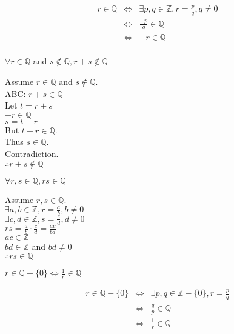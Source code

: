 \documentclass[letterpaper,12pt,fleqn]{article}
\begin{document}
\begin{theproof}
\begin{eqnarray*}
r\in\mathbb{Q} &\iff& \exists p,q\in\mathbb{Z},r=\frac{p}{q}, q\ne0 \\
    &\iff& \frac{-p}{q}\in\mathbb{Q} \\
    &\iff& -r\in\mathbb{Q} \\
\end{eqnarray*}
\end{theproof}

\begin{theorem}
$\forall r\in\mathbb{Q}$ and $s\notin\mathbb{Q},r+s\notin\mathbb{Q}$
\end{theorem}

\begin{theproof}
Assume $r\in\mathbb{Q}$ and $s\notin\mathbb{Q}$. \\
ABC: $r+s\in\mathbb{Q}$ \\
Let $t=r+s$ \\
$-r\in\mathbb{Q}$ \\
$s=t-r$ \\
But $t-r\in\mathbb{Q}$. \\
Thus $s\in\mathbb{Q}$. \\
Contradiction. \\
$\therefore r+s\notin\mathbb{Q}$
\end{theproof}

\begin{theorem}
$\forall r,s\in\mathbb{Q},rs\in\mathbb{Q}$
\end{theorem}

\begin{theproof}
Assume $r,s\in\mathbb{Q}$. \\
$\exists a,b\in\mathbb{Z},r=\frac{a}{b}, b\ne0$ \\
$\exists c,d\in\mathbb{Z},s=\frac{c}{d}, d\ne0$ \\
$rs=\frac{a}{b}\cdot\frac{c}{d}=\frac{ac}{bd}$ \\
$ac\in\mathbb{Z}$ \\
$bd\in\mathbb{Z}$ and $bd\ne0$ \\
$\therefore rs\in\mathbb{Q}$ \\
\end{theproof}

\begin{lemma}
$r\in\mathbb{Q}-\{0\}\iff \frac{1}{r}\in\mathbb{Q}$
\end{lemma}

\begin{theproof}
\begin{eqnarray*}
r\in\mathbb{Q}-\{0\} &\iff& \exists p,q\in\mathbb{Z}-\{0\},r=\frac{p}{q} \\
    &\iff& \frac{q}{p}\in\mathbb{Q} \\
    &\iff& \frac{1}{r}\in\mathbb{Q} \\
\end{eqnarray*}
\end{theproof}
\end{document}
